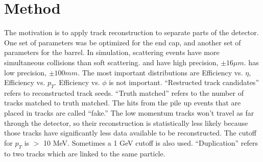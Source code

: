\documentclass{article}
\newcommand{\pic}[2]{\beg{center}{\texttt{[image: \#2]}}}
\newcommand{\figpic}[3]{
\begin{figure}[H]
\begin{center}
\pic{#1}{#2}
\caption{#3}
\end{center}
\end{figure}}
\begin{document}
\section{Method}
The motivation is to apply track reconstruction to separate parts of the detector. One set of parameters was be optimized for the end cap, and another set of parameters for the barrel. 
In simulation, scattering events have more simultaneous collisions than soft scattering.  and  have high precision, $\pm 16 \mu m$.  has low precision, $\pm 100 mm$. The most important distributions are Efficiency vs. $\eta$, Efficiency vs. $p_T$. Efficiency vs. $\phi$ is not important. ``Restructed track candidates'' refers to reconstructed track seeds. ``Truth matched'' refers to the number of tracks matched to truth matched. The hits from the pile up events that are placed in tracks are called ``fake.'' The low momentum tracks won't travel as far through the detector, so their reconstruction is statistically less likely because those tracks have significantly less data available to be reconstructed. The cutoff for $p_T$ is $>$ 10 MeV. Sometimes a 1 GeV cutoff is also used. ``Duplication'' refers to two tracks which are linked to the same particle.
\end{document}
